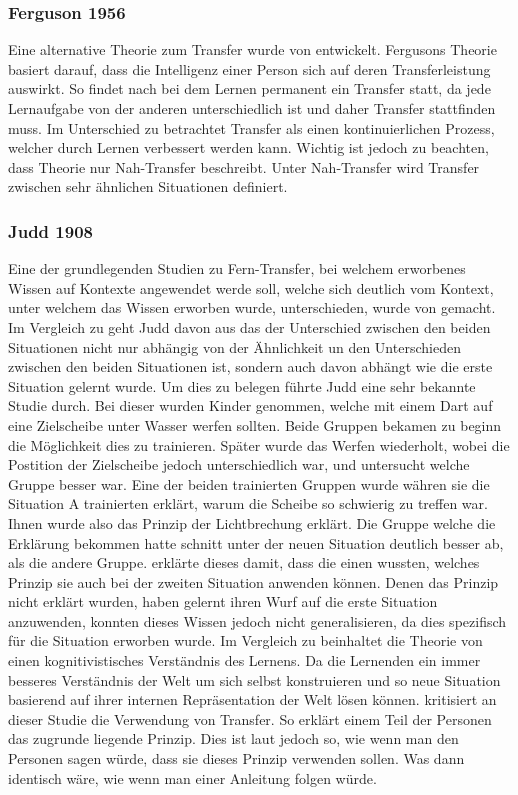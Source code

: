 \subsubsection{Ferguson 1956}
Eine alternative Theorie zum Transfer wurde von \citet{Ferguson1956} entwickelt. Fergusons Theorie basiert darauf, dass die Intelligenz einer Person sich auf deren Transferleistung auswirkt. So findet nach \citet{Ferguson1956} bei dem Lernen permanent ein Transfer statt, da jede Lernaufgabe von der anderen unterschiedlich ist und daher Transfer stattfinden muss. Im Unterschied zu \citet{Woodworth1901} betrachtet \citeauthor{Ferguson1956} Transfer als einen kontinuierlichen Prozess, welcher durch Lernen verbessert werden kann. Wichtig ist jedoch zu beachten, dass \citeauthor{Ferguson1956} Theorie nur Nah-Transfer beschreibt. Unter Nah-Transfer wird Transfer zwischen sehr ähnlichen Situationen definiert. 
\subsubsection{Judd 1908}
Eine der grundlegenden Studien zu Fern-Transfer, bei welchem erworbenes Wissen auf Kontexte angewendet werde soll, welche sich deutlich vom Kontext, unter welchem das Wissen erworben wurde, unterschieden, wurde von \citet{judd1908} gemacht. Im Vergleich zu \citeauthor{Woodworth1901} geht Judd davon aus das der Unterschied zwischen den beiden Situationen nicht nur abhängig von der Ähnlichkeit un den Unterschieden zwischen den beiden Situationen ist, sondern auch davon abhängt wie die erste Situation gelernt wurde. Um dies zu belegen führte Judd eine sehr bekannte Studie durch. Bei dieser wurden Kinder genommen, welche mit einem Dart auf eine Zielscheibe unter Wasser werfen sollten. Beide Gruppen bekamen zu beginn die Möglichkeit dies zu trainieren. Später wurde das Werfen wiederholt, wobei die Postition der Zielscheibe jedoch unterschiedlich war, und untersucht welche Gruppe besser war. Eine der beiden trainierten Gruppen wurde währen sie die Situation A trainierten erklärt, warum die Scheibe so schwierig zu treffen war. Ihnen wurde also das Prinzip der Lichtbrechung erklärt. Die Gruppe welche die Erklärung bekommen hatte schnitt unter der neuen Situation deutlich besser ab, als die andere Gruppe. \citet{judd1908} erklärte dieses damit, dass die einen wussten, welches Prinzip sie auch bei der zweiten Situation anwenden können. Denen das Prinzip nicht erklärt wurden, haben gelernt ihren Wurf auf die erste Situation anzuwenden, konnten dieses Wissen jedoch nicht generalisieren, da dies spezifisch für die Situation erworben wurde. Im Vergleich zu \citeauthor{Woodworth1901} beinhaltet die Theorie von \citeauthor{judd1908} einen kognitivistisches Verständnis des Lernens. Da die Lernenden ein immer besseres Verständnis der Welt um sich selbst konstruieren und so neue Situation basierend auf ihrer internen Repräsentation der Welt lösen können. \citet{Detterman1993} kritisiert an dieser Studie die Verwendung von Transfer. So erklärt \citeauthor{judd1908} einem Teil der Personen das zugrunde liegende Prinzip. Dies ist laut \citeauthor{Detterman1993} jedoch so, wie wenn man den Personen sagen würde, dass sie dieses Prinzip verwenden sollen. Was dann identisch wäre, wie wenn man einer Anleitung folgen würde.

